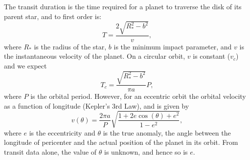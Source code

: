 The transit duration is the time required for a planet to traverse the
disk of its parent star, and to first order is:
\begin{equation}\label{eq:duration}
T = \frac{2 \sqrt{R_*^2 - b^2}}{v},
\end{equation}
where $R_*$ is the radius of the star, $b$ is the minimum impact
parameter, and $v$ is the instantaneous velocity of the planet. On a
circular orbit, $v$ is constant ($v_c$) and we expect
\begin{equation}\label{eq:durcirc}
T_c = \frac{\sqrt{R_*^2 - b^2}}{\pi a}P,
\end{equation}
where $P$ is the orbital period. However, for an eccentric orbit the
orbital velocity as a function of longitude (Kepler's 3rd Law), and is
given by
\begin{equation}\label{eq:velocity}
v(\theta) = \frac{2\pi a}{P}\sqrt{\frac{1 + 2e\cos(\theta) + e^2}{1-e^2}},
\end{equation}
where $e$ is the eccentricity and $\theta$ is the true anomaly, the
angle between the longitude of pericenter and the actual position of
the planet in its orbit. From transit data alone, the value of
$\theta$ is unknown, and hence so is $e$.


